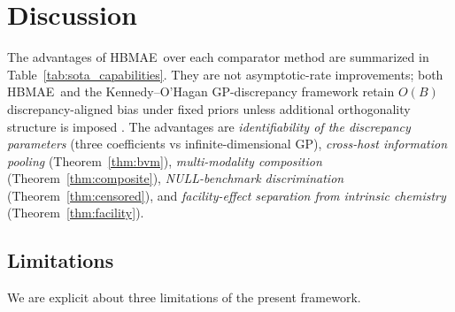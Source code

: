 \documentclass[12pt]{article}
\theoremstyle{plain}
\theoremstyle{definition}
\theoremstyle{remark}
\newcommand{\HBMAE}{HBMAE\xspace}
\begin{document}
\section{Discussion}\label{sec:discussion}

The advantages of \HBMAE\ over each comparator method are summarized in
Table~\ref{tab:sota_capabilities}.  They are not asymptotic-rate
improvements; both \HBMAE\ and the Kennedy--O'Hagan GP-discrepancy framework
retain $O(B)$ discrepancy-aligned bias under fixed priors unless additional
orthogonality structure is imposed
\citep{TuoWu2015,TuoWu2016,Plumlee2017}.  The advantages are
\emph{identifiability of the discrepancy parameters} (three coefficients vs
infinite-dimensional GP), \emph{cross-host information pooling}
(Theorem~\ref{thm:bvm}), \emph{multi-modality composition}
(Theorem~\ref{thm:composite}), \emph{NULL-benchmark discrimination}
(Theorem~\ref{thm:censored}), and \emph{facility-effect separation from
intrinsic chemistry} (Theorem~\ref{thm:facility}).

\subsection{Limitations}\label{sec:discussion:limitations}

We are explicit about three limitations of the present framework.
\end{document}
